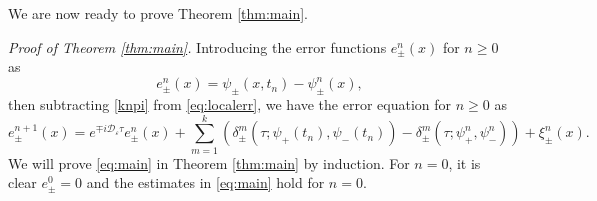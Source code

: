 \documentclass[final,leqno,showlabe]{siamltex}
\begin{document}
We are now ready to prove Theorem \ref{thm:main}.

{\it Proof of Theorem \ref{thm:main}.}
Introducing the error functions $e_\pm^n(x)$ for $n\ge0$ as
\begin{equation}\label{eq:error}
e_\pm^n(x)=\psi_\pm(x,t_n)-\psi_\pm^n(x),
\end{equation}
then subtracting \eqref{knpi} from \eqref{eq:localerr}, we have the error equation  for $n\ge0$ as
\begin{equation}\label{eq:errorgrowth}
e_{\pm}^{n+1}(x)=e^{\mp i\mathcal{D}_\varepsilon\tau}e_\pm^n(x)+\sum\limits_{m=1}^k\left(
\delta_{\pm}^m(\tau;\psi_+(t_n),\psi_-(t_n))-\delta_{\pm}^m(\tau;\psi_+^n,\psi_-^n)\right)+\xi_\pm^n(x).
\end{equation}
We will prove  \eqref{eq:main} in Theorem \ref{thm:main} by induction. For $n=0$, it is clear $e_{\pm}^0=0$ and the estimates in \eqref{eq:main} hold for $n=0$.
\end{document}
